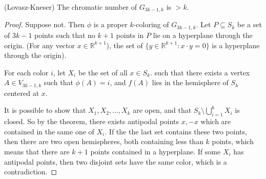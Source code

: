 \begin{theorem}
	(Lovasz-Kneser) The chromatic number of \( G_{3k-1, k} \) is \( >k \).
\end{theorem}
\begin{proof}
	Suppose not. Then \( \phi  \) is a proper \( k \)-coloring of \( G_{3k-1, k} \). Let \( P \subseteq S_k \) be a set of \( 3k-1 \) points such that no \( k+1 \) points in \( P \) lie on a hyperplane through the origin. (For any vector \( x \in \mathbb{R}^{k+1}  \)), the set of \( \{y \in \mathbb{R}^{k+1} : x \cdot y = 0 \}   \) is a hyperplane through the origin).

	For each color \( i \), let \( X_i \) be the set of all \( x \in S_k \). such that there exists a vertex \( A \in V_{3k-1, k} \) such that \( \phi (A) = i \), and \( f(A) \) lies in the hemisphere of \( S_k \) centered at \( x \).

	It is possible to show that \( X_{1}, X_{2}, \ldots , X_k \) are open, and that \( S_k \setminus \bigcup_{i=1}^{k}X_i  \) is closed. So by the theorem, there exists antipodal points \( x, -x \) which are contained in the same one of \( X_i \). If the the last set contains these two points, then there are two open hemispheres, both containing less than \( k \) points, which means that there are \( k+1 \) points contained in a hyperplane. If some \( X_i \) has antipodal points, then two disjoint sets have the same color, which is a contradiction.
\end{proof}
